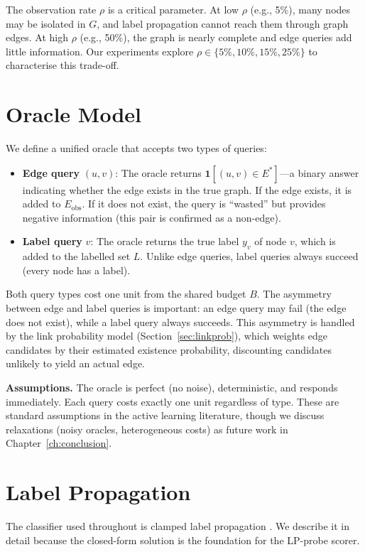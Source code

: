 \documentclass[12pt,a4paper,oneside]{report}
\begin{document}
The observation rate $\rho$ is a critical parameter. At low $\rho$ (e.g., 5\%), many nodes may be isolated in $G$, and label propagation cannot reach them through graph edges. At high $\rho$ (e.g., 50\%), the graph is nearly complete and edge queries add little information. Our experiments explore $\rho \in \{5\%, 10\%, 15\%, 25\%\}$ to characterise this trade-off.

\section{Oracle Model}

We define a unified oracle that accepts two types of queries:
\begin{itemize}[leftmargin=2em]
    \item \textbf{Edge query} $(u, v)$: The oracle returns $\mathbf{1}[(u,v) \in E^*]$---a binary answer indicating whether the edge exists in the true graph. If the edge exists, it is added to $E_{\text{obs}}$. If it does not exist, the query is ``wasted'' but provides negative information (this pair is confirmed as a non-edge).
    \item \textbf{Label query} $v$: The oracle returns the true label $y_v$ of node $v$, which is added to the labelled set $L$. Unlike edge queries, label queries always succeed (every node has a label).
\end{itemize}
Both query types cost one unit from the shared budget $B$. The asymmetry between edge and label queries is important: an edge query may fail (the edge does not exist), while a label query always succeeds. This asymmetry is handled by the link probability model (Section~\ref{sec:linkprob}), which weights edge candidates by their estimated existence probability, discounting candidates unlikely to yield an actual edge.

\textbf{Assumptions.} The oracle is perfect (no noise), deterministic, and responds immediately. Each query costs exactly one unit regardless of type. These are standard assumptions in the active learning literature, though we discuss relaxations (noisy oracles, heterogeneous costs) as future work in Chapter~\ref{ch:conclusion}.

\section{Label Propagation}
\label{sec:lp_formulation}

The classifier used throughout is clamped label propagation \citep{zhu}. We describe it in detail because the closed-form solution is the foundation for the LP-probe scorer.
\end{document}
